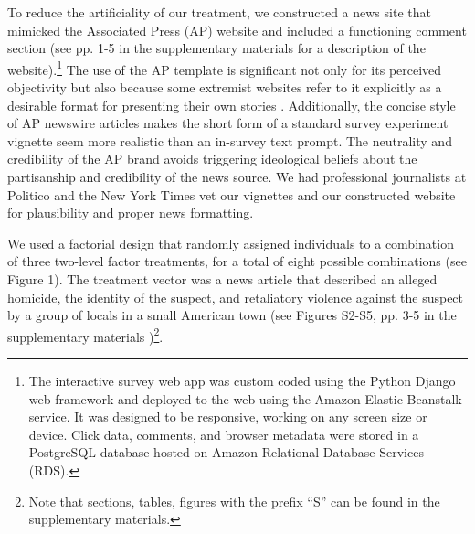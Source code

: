 To reduce the artificiality of our treatment, we constructed a news site that mimicked the Associated Press (AP) website and included a functioning comment section (see pp. 1-5 in the supplementary materials for a description of the website).\footnote{The interactive survey web app was custom coded using the Python Django web framework and deployed to the web using the Amazon Elastic Beanstalk service. It was designed to be responsive, working on any screen size or device. Click data, comments, and browser metadata were stored in a PostgreSQL database hosted on Amazon Relational Database Services (RDS).} The use of the AP template is significant not only for its perceived objectivity but also because some extremist websites refer to it explicitly as a desirable format for presenting their own stories \citep{feinberg2017daily}. Additionally, the concise style of AP newswire articles makes the short form of a standard survey experiment vignette seem more realistic than an in-survey text prompt. The neutrality and credibility of the AP brand avoids triggering ideological beliefs about the partisanship and credibility of the news source.  We had professional journalists at Politico and the New York Times vet our vignettes and our constructed website for plausibility and proper news formatting. 

We used a factorial design that randomly assigned individuals to a combination of three two-level factor treatments, for a total of eight possible combinations (see Figure 1). The treatment vector was a news article that described an alleged homicide, the identity of the suspect, and retaliatory violence against the suspect by a group of locals in a small American town (see Figures S2-S5, pp. 3-5 in the supplementary materials )\footnote{Note that sections, tables, figures with the prefix ``S'' can be found in the supplementary materials.}. 

